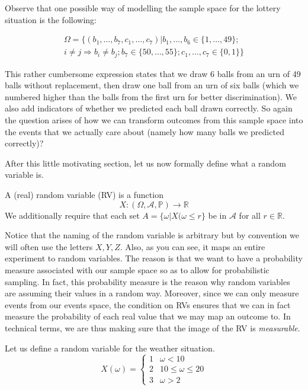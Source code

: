 \documentclass[a4paper,11pt,leqno]{report}
\begin{document}
Observe that one possible way of modelling the sample space for the lottery situation is the following:

\begin{align}
\Omega = \{(b_{1}, \ldots, b_{7}, c_{1}, \ldots, c_{7})| b_{1}, \ldots, b_{6} \in \{1,\ldots, 49\}; \\
i \not = j \Rightarrow b_{i} \not = b_{j};
b_{7} \in \{50, \ldots, 55\}; c_{1}, \ldots, c_{7} \in \{0,1\} \} \nonumber
\end{align}

This rather cumbersome expression states that we draw 6 balls from an urn of 49 balls without replacement,
then draw one ball from an urn of six balls (which we numbered higher than the balls from the first
urn for better discrimination). We also add indicators of whether we predicted each ball drawn correctly.
So again the question arises of how we can transform outcomes from this sample space into
the events that we actually care about (namely how many balls we predicted correctly)?

After this little motivating section, let us now formally define what a random variable is.

\begin{Definition} 
A (real) random variable (RV) is a function
$$ X: (\Omega, \mathcal{A}, \mathbb{P}) \rightarrow \mathbb{R} $$
We additionally require that each set $ A = \{\omega| X(\omega \leq r\} $ be in $ \mathcal{A} $ for
all $ r \in \mathbb{R} $.
\end{Definition}

Notice that the naming of the random variable is arbitrary but by convention we will often use the letters
$ X,Y,Z $. Also, as you can see, it maps an entire experiment to random variables. The reason is that
we want to have a probability measure associated with our sample space so as to allow for probabilistic
sampling. In fact, this probability measure is the reason why random variables are assuming their values
in a random way. Moreover, since we can only measure events from our events space, the condition on RVs
ensures that we can in fact measure the probability of each real value that we may map an outcome to.
In technical terms, we are thus making sure that the image of the RV is \textit{measurable}.

Let us define a random variable for the weather situation. 
\begin{equation} \label{weatherRV}
X(\omega) = 
\begin{cases}
1 & \omega < 10 \\
2 & 10 \leq \omega \leq 20 \\
3 & \omega > 2
\end{cases}
\end{equation}
\end{document}
